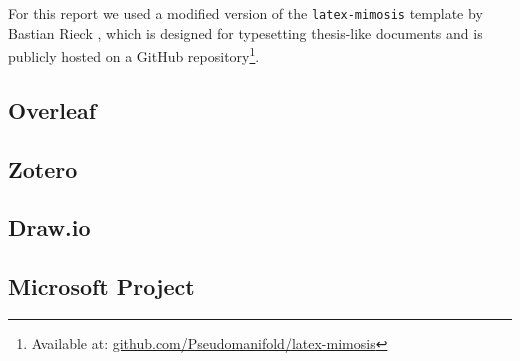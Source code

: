 For this report we used a modified version of the \texttt{latex-mimosis} template by Bastian Rieck \cite{rieck_latex-mimosis_2022}, which is designed for typesetting thesis-like documents and is publicly hosted on a GitHub repository\footnote{Available at: \url{github.com/Pseudomanifold/latex-mimosis}}.

\subsection{Overleaf}

\subsection{Zotero}

\subsection{Draw.io}

\subsection{Microsoft Project}